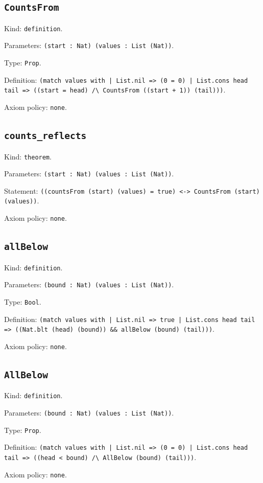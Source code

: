 \documentclass[11pt]{article}
\begin{document}
\subsection*{\texttt{CountsFrom}}
\noindent Kind: \texttt{definition}.\par
\noindent Parameters: \texttt{(start : Nat) (values : List (Nat))}.\par
\noindent Type: \texttt{Prop}.\par
\noindent Definition: \texttt{(match values with | List.nil => (0 = 0) | List.cons head tail => ((start = head) /\textbackslash{} CountsFrom ((start + 1)) (tail)))}.\par
\noindent Axiom policy: \texttt{none}.\par
\subsection*{\texttt{counts\_reflects}}
\noindent Kind: \texttt{theorem}.\par
\noindent Parameters: \texttt{(start : Nat) (values : List (Nat))}.\par
\noindent Statement: \texttt{((countsFrom (start) (values) = true) <-> CountsFrom (start) (values))}.\par
\noindent Axiom policy: \texttt{none}.\par
\subsection*{\texttt{allBelow}}
\noindent Kind: \texttt{definition}.\par
\noindent Parameters: \texttt{(bound : Nat) (values : List (Nat))}.\par
\noindent Type: \texttt{Bool}.\par
\noindent Definition: \texttt{(match values with | List.nil => true | List.cons head tail => ((Nat.blt (head) (bound)) \&\& allBelow (bound) (tail)))}.\par
\noindent Axiom policy: \texttt{none}.\par
\subsection*{\texttt{AllBelow}}
\noindent Kind: \texttt{definition}.\par
\noindent Parameters: \texttt{(bound : Nat) (values : List (Nat))}.\par
\noindent Type: \texttt{Prop}.\par
\noindent Definition: \texttt{(match values with | List.nil => (0 = 0) | List.cons head tail => ((head < bound) /\textbackslash{} AllBelow (bound) (tail)))}.\par
\noindent Axiom policy: \texttt{none}.\par
\end{document}
